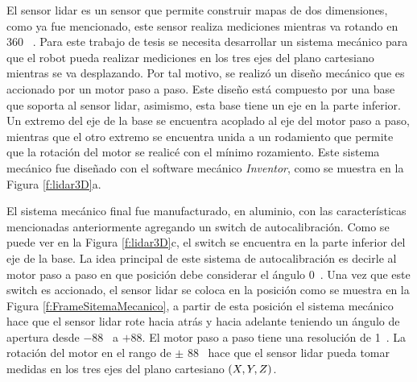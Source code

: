 El sensor lidar es un sensor que permite construir mapas de dos dimensiones, como ya 
fue mencionado, este sensor realiza mediciones mientras va rotando en 360 \grad~. Para 
este trabajo de tesis se necesita desarrollar un sistema mecánico para que el robot 
pueda realizar mediciones en los tres ejes del plano cartesiano mientras se va 
desplazando. Por tal motivo, se realizó un diseño mecánico que es accionado por un motor
paso a paso. Este diseño está compuesto por una base que soporta al sensor lidar, asimismo, 
esta base tiene un eje en la parte inferior. Un extremo del eje de la base se encuentra 
acoplado al eje del motor paso a paso, mientras que el otro extremo se encuentra unida 
a un rodamiento que permite que la rotación del motor se realicé con el mínimo rozamiento. Este
sistema mecánico fue diseñado con el software mecánico \textit{Inventor}, como se muestra
en la Figura \ref{f:lidar3D}a.

El sistema mecánico final fue manufacturado, en aluminio, con las características mencionadas
anteriormente agregando un switch de autocalibración. Como se puede ver en la Figura 
\ref{f:lidar3D}c, el switch se encuentra en la parte inferior del eje de la base. La idea 
principal de este sistema de autocalibración es decirle al motor paso a paso en que posición 
debe considerar el ángulo 0\grad~. Una vez que este switch es accionado, el sensor lidar se 
coloca en la posición como se muestra en la Figura \ref{f:FrameSitemaMecanico}, a partir de esta 
posición el sistema mecánico hace que el sensor lidar rote hacia atrás y hacia adelante teniendo 
un ángulo de apertura desde $-88$\grad~ a $+88$\grad. El motor paso a paso tiene una resolución
de 1\grad~. La rotación del motor en el rango de $\pm$ 88\grad~ hace que el sensor lidar pueda 
tomar medidas en los tres ejes del plano cartesiano $(\mathnormal X,\mathnormal Y,\mathnormal Z)$.

